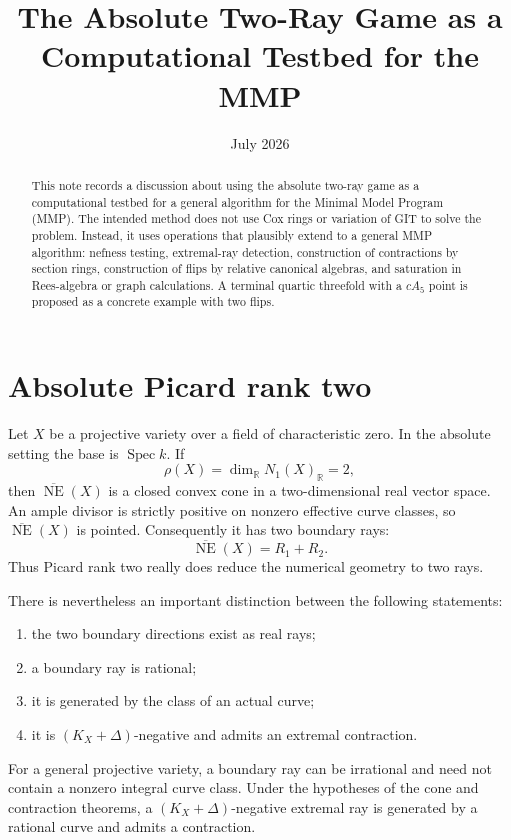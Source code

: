 \documentclass[11pt]{article}
\title{The Absolute Two-Ray Game as a Computational Testbed for the MMP}
\author{}
\date{July 2026}
\newcommand{\NE}{\overline{\operatorname{NE}}}
\newcommand{\Spec}{\operatorname{Spec}}
\begin{document}
\maketitle

\begin{abstract}
This note records a discussion about using the absolute two-ray game as a
computational testbed for a general algorithm for the Minimal Model Program
(MMP).  The intended method does not use Cox rings or variation of GIT to
solve the problem.  Instead, it uses operations that plausibly extend to a
general MMP algorithm: nefness testing, extremal-ray detection, construction
of contractions by section rings, construction of flips by relative canonical
algebras, and saturation in Rees-algebra or graph calculations.  A terminal
quartic threefold with a $cA_5$ point is proposed as a concrete example with
two flips.
\end{abstract}

\section{Absolute Picard rank two}

Let $X$ be a projective variety over a field of characteristic zero.  In the
absolute setting the base is $\Spec k$.  If
\[
  \rho(X)=\dim_{\mathbb R}N_1(X)_{\mathbb R}=2,
\]
then $\NE(X)$ is a closed convex cone in a two-dimensional real vector space.
An ample divisor is strictly positive on nonzero effective curve classes, so
$\NE(X)$ is pointed.  Consequently it has two boundary rays:
\[
  \NE(X)=R_1+R_2.
\]
Thus Picard rank two really does reduce the numerical geometry to two rays.

There is nevertheless an important distinction between the following
statements:
\begin{enumerate}[label=(\roman*)]
  \item the two boundary directions exist as real rays;
  \item a boundary ray is rational;
  \item it is generated by the class of an actual curve;
  \item it is $(K_X+\Delta)$-negative and admits an extremal contraction.
\end{enumerate}
For a general projective variety, a boundary ray can be irrational and need
not contain a nonzero integral curve class.  Under the hypotheses of the cone
and contraction theorems, a $(K_X+\Delta)$-negative extremal ray is generated
by a rational curve and admits a contraction.
\end{document}
